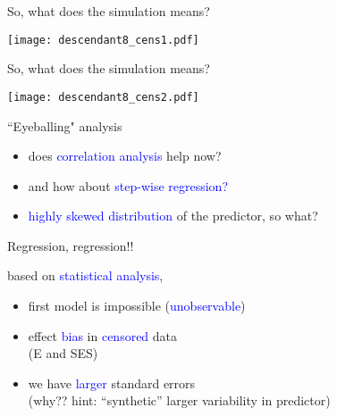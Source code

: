%
%
\begin{frame}
	{So, what does the simulation means?}
	
	\begin{figure*}
		\texttt{[image: descendant8\_cens1.pdf]}
	\end{figure*}
\end{frame}
%
%
\begin{frame}
	{So, what does the simulation means?}
	
	\begin{figure*}
		\texttt{[image: descendant8\_cens2.pdf]}
	\end{figure*}
\end{frame}
%
%
\begin{lhframe}[rhgraphic={\texttt{[image: descendant8\_panel.pdf]}}]
	{``Eyeballing" analysis}
	
	\begin{itemize}
		\item does \textcolor{blue}{correlation analysis} help now?
		\item and how about \textcolor{blue}{step-wise regression?} \\
		\item \textcolor{blue}{highly skewed distribution} of the predictor, so what?
	\end{itemize}
	
\end{lhframe}
%
%
\begin{lhframe}[rhgraphic={\texttt{[image: descendant8\_reg.png]}}]
	{Regression, regression!!}
	
	based on \textcolor{blue}{statistical analysis},
	\begin{itemize}
		\item first model is impossible (\textcolor{blue}{unobservable})
		\item effect \textcolor{blue}{bias} in \textcolor{blue}{censored} data \\
		(E and SES)
		\item we have \textcolor{blue}{larger} standard errors \\
		{\small (why?? hint: ``synthetic'' larger variability in predictor)}
	\end{itemize}
\end{lhframe}
%
%
